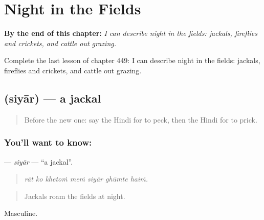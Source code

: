 
\chapter{Night in the Fields}
\label{ch:hi-night-in-the-fields}

\begin{chapteropening}
\textbf{By the end of this chapter:} \emph{I can describe night in the fields: jackals, fireflies and crickets, and cattle out grazing.}

Complete the last lesson of chapter 449: I can describe night in the fields: jackals, fireflies and crickets, and cattle out grazing.
\end{chapteropening}

\section[\texorpdfstring{\hi{सियार} (siyār)}{सियार (siyār)}]{ (siyār) — a jackal}

\label{lesson:HI-C449-siyar}



\begin{quote}
Before the new one: say the Hindi for to peck, then the Hindi for to prick.
\end{quote}

\subsection*{You'll want to know: }
\textbf{} — \emph{siyār} — \textquotedblleft{}a jackal\textquotedblright{}.

\begin{quote}
      
\end{quote}

\begin{quote}
\emph{rāt ko khetoṁ meṁ siyār ghūmte haiṁ.}
\end{quote}

\begin{quote}
Jackals roam the fields at night.
\end{quote}

Masculine.

